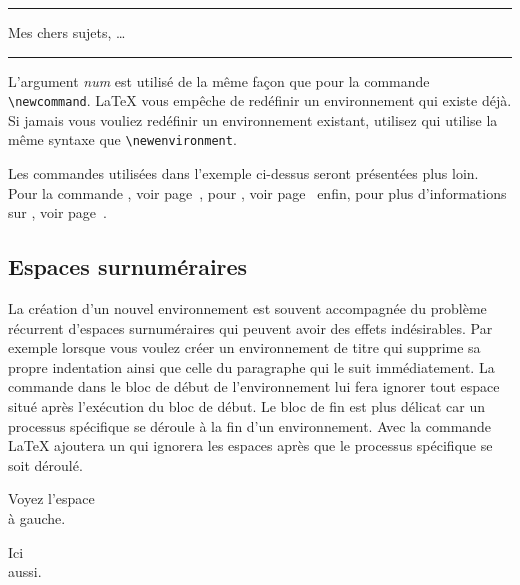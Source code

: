 \begin{example}
\newenvironment{king}
 {\rule{1ex}{1ex}%
      \hspace{\stretch{1}}}
 {%
      \rule{1ex}{1ex}}

\begin{king} 
Mes chers sujets, \dots
\end{king}
\end{example}

L'argument \emph{num} est utilisé de la même façon que pour la
commande \verb|\newcommand|. \LaTeX{} vous empêche de redéfinir un
environnement qui existe déjà. Si jamais vous vouliez redéfinir un
environnement existant, utilisez  qui utilise la
même syntaxe que \verb|\newenvironment|.

Les commandes utilisées dans l'exemple ci-dessus seront présentées
plus loin. Pour la commande , voir page~\pageref{sec:rule},
pour , voir page~\pageref{cmd:stretch} enfin, pour plus
d'informations sur , voir page~\pageref{sec:hspace}.

\subsection{Espaces surnuméraires}

La création d'un nouvel environnement est souvent accompagnée du
problème récurrent d'espaces surnuméraires qui peuvent avoir des
effets indésirables. Par exemple lorsque vous voulez créer un
environnement de titre qui supprime sa propre indentation ainsi que
celle du paragraphe qui le suit immédiatement. La commande
 dans le bloc de début de l'environnement lui fera
ignorer tout espace situé après l'exécution du bloc de début. Le bloc
de fin est plus délicat car un processus spécifique se déroule à la
fin d'un environnement. Avec la commande 
\LaTeX{} ajoutera un  qui ignorera les espaces après
que le processus spécifique se soit déroulé.

\begin{example}
\newenvironment{simple}%
 {\noindent}%
 {\par\noindent}

\begin{simple}
Voyez l'espace\\à gauche.
\end{simple}
Ici\\aussi.
\end{example}

